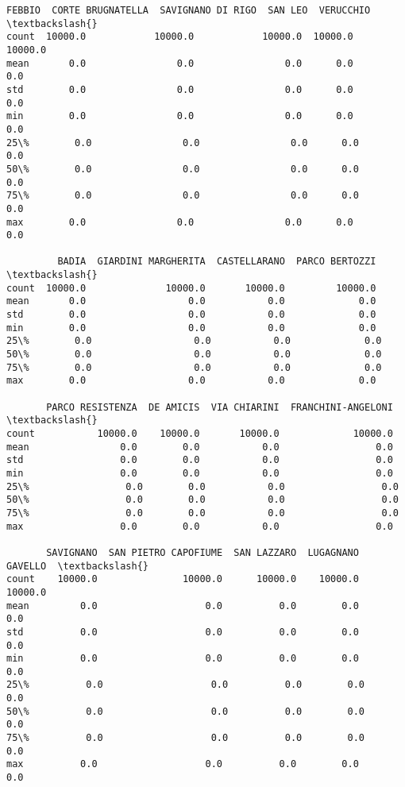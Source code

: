\documentclass[11pt]{article}
\begin{document}
\begin{tcolorbox}[breakable, size=fbox, boxrule=.5pt, pad at break*=1mm, opacityfill=0]
\begin{Verbatim}[commandchars=\\\{\}]
        FEBBIO  CORTE BRUGNATELLA  SAVIGNANO DI RIGO  SAN LEO  VERUCCHIO  \textbackslash{}
count  10000.0            10000.0            10000.0  10000.0    10000.0
mean       0.0                0.0                0.0      0.0        0.0
std        0.0                0.0                0.0      0.0        0.0
min        0.0                0.0                0.0      0.0        0.0
25\%        0.0                0.0                0.0      0.0        0.0
50\%        0.0                0.0                0.0      0.0        0.0
75\%        0.0                0.0                0.0      0.0        0.0
max        0.0                0.0                0.0      0.0        0.0

         BADIA  GIARDINI MARGHERITA  CASTELLARANO  PARCO BERTOZZI  \textbackslash{}
count  10000.0              10000.0       10000.0         10000.0
mean       0.0                  0.0           0.0             0.0
std        0.0                  0.0           0.0             0.0
min        0.0                  0.0           0.0             0.0
25\%        0.0                  0.0           0.0             0.0
50\%        0.0                  0.0           0.0             0.0
75\%        0.0                  0.0           0.0             0.0
max        0.0                  0.0           0.0             0.0

       PARCO RESISTENZA  DE AMICIS  VIA CHIARINI  FRANCHINI-ANGELONI  \textbackslash{}
count           10000.0    10000.0       10000.0             10000.0
mean                0.0        0.0           0.0                 0.0
std                 0.0        0.0           0.0                 0.0
min                 0.0        0.0           0.0                 0.0
25\%                 0.0        0.0           0.0                 0.0
50\%                 0.0        0.0           0.0                 0.0
75\%                 0.0        0.0           0.0                 0.0
max                 0.0        0.0           0.0                 0.0

       SAVIGNANO  SAN PIETRO CAPOFIUME  SAN LAZZARO  LUGAGNANO  GAVELLO  \textbackslash{}
count    10000.0               10000.0      10000.0    10000.0  10000.0
mean         0.0                   0.0          0.0        0.0      0.0
std          0.0                   0.0          0.0        0.0      0.0
min          0.0                   0.0          0.0        0.0      0.0
25\%          0.0                   0.0          0.0        0.0      0.0
50\%          0.0                   0.0          0.0        0.0      0.0
75\%          0.0                   0.0          0.0        0.0      0.0
max          0.0                   0.0          0.0        0.0      0.0


\end{Verbatim}
\end{tcolorbox}
\end{document}
